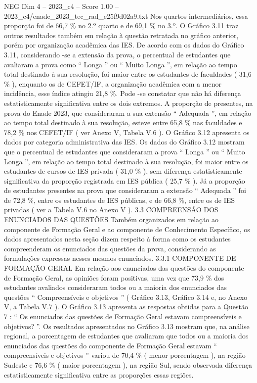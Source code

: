 \begin{textsample}{NEG Dim 4 – 2023\_c4 – Score 1.00 – 2023\_c4/enade\_2023\_tec\_rad\_e25f9d02a9.txt}
Nos quartos intermediários, essa proporção foi de 66,7 \% no 2.º quarto e de 69,1 \% no 3.º.
O Gráfico 3.11 traz outros resultados também em relação à questão retratada no gráfico anterior, porém por organização acadêmica das IES.
De acordo com os dados do Gráfico 3.11, considerando -se a extensão da prova, o percentual de estudantes que avaliaram a prova como “ Longa ” ou “ Muito Longa ”, em relação ao tempo total destinado à sua resolução, foi maior entre os estudantes de faculdades ( 31,6 \% ), enquanto os de CEFET/IF, a organização acadêmica com a menor incidência, esse índice atingiu 21,8 \%.
Pode -se constatar que não há diferença estatisticamente significativa entre os dois extremos.
A proporção de presentes, na prova do Enade 2023, que consideraram a sua extensão “ Adequada ”, em relação ao tempo total destinado à sua resolução, esteve entre 65,8 \% nas faculdades e 78,2 \% nos CEFET/IF ( ver Anexo V, Tabela V.6 ).
O Gráfico 3.12 apresenta os dados por categoria administrativa das IES.
Os dados do Gráfico 3.12 mostram que o percentual de estudantes que consideraram a prova “ Longa ” ou “ Muito Longa ”, em relação ao tempo total destinado à sua resolução, foi maior entre os estudantes de cursos de IES privada ( 31,0 \% ), sem diferença estatisticamente significativa da proporção registrada em IES pública ( 25,7 \% ).
Já a proporção de estudantes presentes na prova que consideraram a extensão “ Adequada ” foi de 72,8 \%, entre os estudantes de IES públicas, e de 66,8 \%, entre os de IES privadas ( ver a Tabela V.6 no Anexo V ). 3.3 COMPREENSÃO DOS ENUNCIADOS DAS QUESTÕES Também organizados em relação ao componente de Formação Geral e ao componente de Conhecimento Específico, os dados apresentados nesta seção dizem respeito à forma como os estudantes compreenderam os enunciados das questões da prova, considerando as formulações expressas nesses mesmos enunciados. 3.3.1 COMPONENTE DE FORMAÇÃO GERAL Em relação aos enunciados das questões do componente de Formação Geral, as opiniões foram positivas, uma vez que 73,9 \% dos estudantes avaliados consideraram todos ou a maioria dos enunciados das questões “ Compreensíveis e objetivos ” ( Gráfico 3.13, Gráfico 3.14 e, no Anexo V, a Tabela V.7 ).
O Gráfico 3.13 apresenta as respostas obtidas para a Questão 7 : “ Os enunciados das questões de Formação Geral estavam compreensíveis e objetivos? ”.
Os resultados apresentados no Gráfico 3.13 mostram que, na análise regional, a porcentagem de estudantes que avaliaram que todos ou a maioria dos enunciados das questões do componente de Formação Geral estavam “ compreensíveis e objetivos ” variou de 70,4 \% ( menor porcentagem ), na região Sudeste e 76,6 \% ( maior porcentagem ), na região Sul, sendo observada diferença estatisticamente significativa entre as proporções essas regiões.

\end{textsample}
